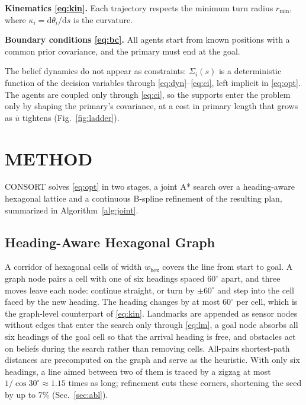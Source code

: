 \documentclass[letterpaper, 10 pt, conference]{ieeeconf}
\theoremstyle{remark}
\begin{document}
\textbf{Kinematics \eqref{eq:kin}.} Each trajectory respects the minimum
turn radius $r_{\min}$, where $\kappa_i = \mathrm{d}\theta_i/\mathrm{d}s$ is
the curvature.

\textbf{Boundary conditions \eqref{eq:bc}.} All agents start from known
positions with a common prior covariance, and the primary must end at the
goal.

The belief dynamics do not appear as constraints: $\Sigma_i(s)$ is a
deterministic function of the decision variables through
\eqref{eq:dyn}--\eqref{eq:ci}, left implicit in \eqref{eq:opt}. The agents
are coupled only through \eqref{eq:ci}, so the supports enter the problem
only by shaping the primary's covariance, at a cost in primary length that grows as $\bar{u}$ tightens (Fig.~\ref{fig:ladder}).

\section{METHOD}
\label{sec:method}
CONSORT solves \eqref{eq:opt} in two stages, a joint A* search over a
heading-aware hexagonal lattice and a continuous B-spline refinement of the
resulting plan, summarized in Algorithm~\ref{alg:joint}.

\subsection{Heading-Aware Hexagonal Graph}

A corridor of hexagonal cells \cite{duszak2021hexgrid} of width
$w_{\mathrm{hex}}$ covers the line from start to goal. A graph node pairs a
cell with
one of six headings spaced $60^\circ$ apart, and three moves leave each
node: continue straight, or turn by $\pm 60^\circ$ and step into the cell
faced by the new heading. The heading changes by at most $60^\circ$ per
cell, which is the graph-level counterpart of \eqref{eq:kin}. Landmarks are
appended as sensor nodes without edges that enter the search only through
\eqref{eq:lm}, a goal node absorbs all six headings of the goal cell so that
the arrival heading is free, and obstacles act on beliefs during the search
rather than removing cells. All-pairs shortest-path distances are
precomputed on the graph and serve as the heuristic. 
With only six headings, a line aimed between two of them is traced by a zigzag
at most $1/\cos 30^\circ \approx 1.15$ times as long; refinement cuts these
corners, shortening the seed by up to 7\% (Sec.~\ref{sec:abl}).
\end{document}
